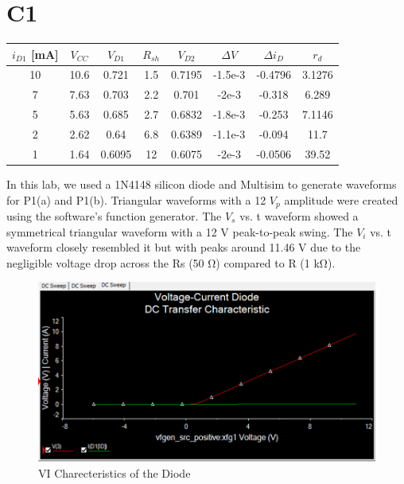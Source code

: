 

\section{{C1}}

\begin{table}[H]
    \centering
    \begin{tabular}{|c|c|c|c|c|c|c|c|}
    \hline\hline
        $i_{D1}$ [mA]  & $V_{CC}$ & $V_{D1}$ & $R_{sh}$ & $V_{D2}$ & $\Delta V$ & $\Delta i_D$ & $r_d$ \\ \hline\hline
        10 & 10.6 & 0.721 & 1.5 & 0.7195 & -1.5e-3 & -0.4796 & 3.1276 \\ \hline
        7 & 7.63 & 0.703 & 2.2 & 0.701 & -2e-3 & -0.318 & 6.289 \\ \hline
        5 & 5.63 & 0.685 & 2.7 & 0.6832 & -1.8e-3 & -0.253 & 7.1146 \\ \hline
        2 & 2.62 & 0.64 & 6.8 & 0.6389 & -1.1e-3 & -0.094 & 11.7 \\ \hline
        1 & 1.64 & 0.6095 & 12 & 0.6075 & -2e-3 & -0.0506 & 39.52 \\ \hline\hline
    \end{tabular}
\end{table}

	{In this lab, we used a 1N4148 silicon diode and Multisim to generate waveforms for P1(a) and P1(b). Triangular waveforms with a 12 $V_p$ amplitude were created using the software's function generator. The $V_s$ vs. t waveform showed a symmetrical triangular waveform with a 12 V peak-to-peak swing. The $V_i$ vs. t waveform closely resembled it but with peaks around 11.46 V due to the negligible voltage drop across the Rs (50 Ω) compared to R (1 kΩ).}

\begin{figure}[H]
    \centering
    \includegraphics[width=14cm]{vi.png}
    \caption{VI Charecteristics of the Diode}
\end{figure}
	
